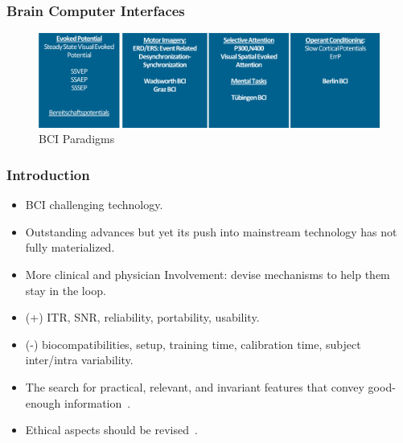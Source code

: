\documentclass[aspectratio=169]{beamer}
\begin{document}
\begin{frame}   
\frametitle{Brain Computer Interfaces}
\begin{figure}[]
\centering
\includegraphics[scale=0.5]{images/BCIParadigms.png}
\caption[Wearable portable Digital Electroencephalograph]{BCI Paradigms}
\label{fig:digitalelectroencephalograph}
\end{figure}
\end{frame}   
    

    \begin{frame}
        \frametitle{Introduction}
        \begin{center}
            \begin{itemize}
                \item BCI challenging technology.
                \item Outstanding advances but yet its push into mainstream technology has not fully materialized.
                \item More clinical and physician Involvement: devise mechanisms to help them stay in the loop.
                \item (+) ITR, SNR, reliability, portability, usability.
                \item (-)  biocompatibilities, setup, training time, calibration time, subject inter/intra variability.
                \item The search for practical, relevant, and invariant features that convey good-enough information~.
                \item Ethical aspects should be revised~.
            \end{itemize}
        \end{center}
    \end{frame} 
    
\end{document}
